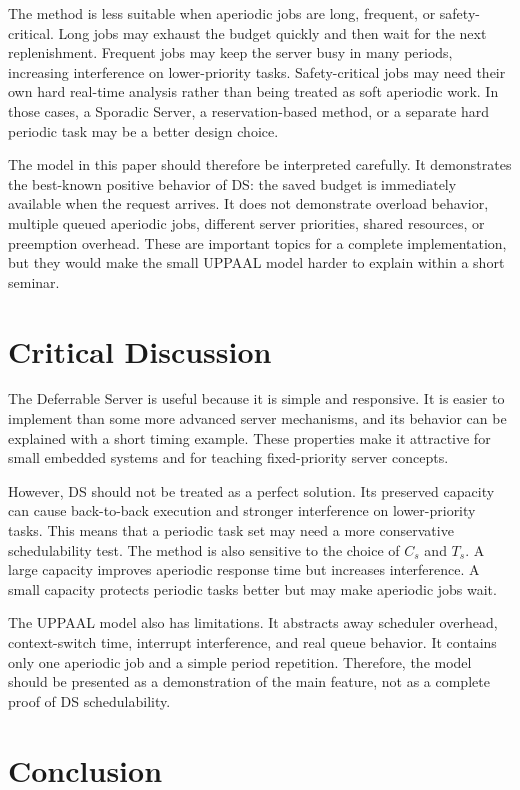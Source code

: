 \documentclass[conference]{IEEEtran}
\begin{document}
	The method is less suitable when aperiodic jobs are long, frequent, or safety-critical. Long jobs may exhaust the budget quickly and then wait for the next replenishment. Frequent jobs may keep the server busy in many periods, increasing interference on lower-priority tasks. Safety-critical jobs may need their own hard real-time analysis rather than being treated as soft aperiodic work. In those cases, a Sporadic Server, a reservation-based method, or a separate hard periodic task may be a better design choice.
	
	The model in this paper should therefore be interpreted carefully. It demonstrates the best-known positive behavior of DS: the saved budget is immediately available when the request arrives. It does not demonstrate overload behavior, multiple queued aperiodic jobs, different server priorities, shared resources, or preemption overhead. These are important topics for a complete implementation, but they would make the small UPPAAL model harder to explain within a short seminar.
	
	\section{Critical Discussion}
	
	The Deferrable Server is useful because it is simple and responsive. It is easier to implement than some more advanced server mechanisms, and its behavior can be explained with a short timing example. These properties make it attractive for small embedded systems and for teaching fixed-priority server concepts.
	
	However, DS should not be treated as a perfect solution. Its preserved capacity can cause back-to-back execution and stronger interference on lower-priority tasks. This means that a periodic task set may need a more conservative schedulability test. The method is also sensitive to the choice of $C_s$ and $T_s$. A large capacity improves aperiodic response time but increases interference. A small capacity protects periodic tasks better but may make aperiodic jobs wait.
	
	The UPPAAL model also has limitations. It abstracts away scheduler overhead, context-switch time, interrupt interference, and real queue behavior. It contains only one aperiodic job and a simple period repetition. Therefore, the model should be presented as a demonstration of the main feature, not as a complete proof of DS schedulability.
	
	\section{Conclusion}
	
\end{document}
